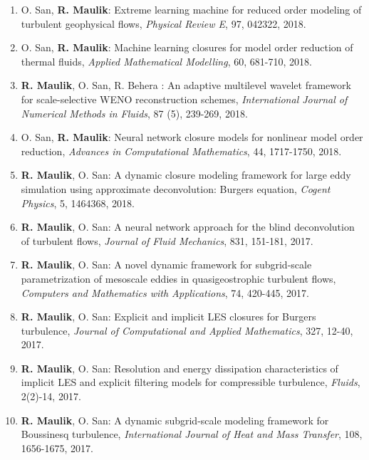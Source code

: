 \documentclass[letterpaper]{article}
\begin{document}
\begin{enumerate}
\item O. San, \textbf{R. Maulik}: Extreme learning machine for reduced order modeling of turbulent geophysical flows, {\it Physical Review E}, 97, 042322, 2018. 

\item O. San, \textbf{R. Maulik}: Machine learning closures for model order reduction of thermal fluids,  {\it Applied Mathematical Modelling}, 60, 681-710, 2018. 

\item \textbf{R. Maulik}, O. San, R. Behera : An adaptive multilevel wavelet framework for scale-selective WENO reconstruction schemes, {\it International Journal of Numerical Methods in Fluids}, 87 (5), 239-269, 2018. 

\item O. San, \textbf{R. Maulik}: Neural network closure models for nonlinear model order reduction, {\it Advances in Computational Mathematics}, 44, 1717-1750, 2018. 

\item \textbf{R. Maulik}, O. San: A dynamic closure modeling framework for large eddy simulation using approximate deconvolution: Burgers equation, {\it Cogent Physics}, 5, 1464368, 2018. 

\item \textbf{R. Maulik}, O. San: A neural network approach for the blind deconvolution of turbulent flows, {\it Journal of Fluid Mechanics}, 831, 151-181, 2017. 

\item \textbf{R. Maulik}, O. San: A novel dynamic framework for subgrid-scale parametrization of mesoscale eddies in quasigeostrophic turbulent flows, {\it Computers and Mathematics with Applications}, 74, 420-445, 2017. 

\item \textbf{R. Maulik}, O. San: Explicit and implicit LES closures for Burgers turbulence, {\it Journal of Computational and Applied Mathematics}, 327, 12-40, 2017. 

\item \textbf{R. Maulik}, O. San: Resolution and energy dissipation characteristics of implicit LES and explicit filtering models for compressible turbulence, {\it Fluids}, 2(2)-14, 2017. 

\item \textbf{R. Maulik}, O. San: A dynamic subgrid-scale modeling framework for Boussinesq turbulence, {\it International Journal of Heat and Mass Transfer}, 108, 1656-1675, 2017. 


\end{enumerate}
\end{document}
